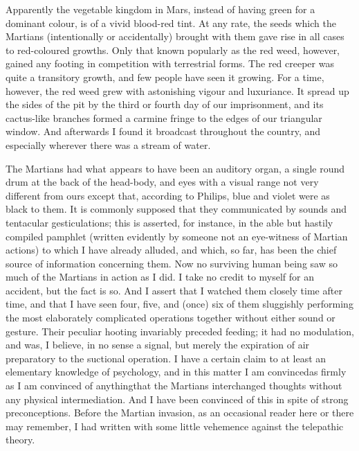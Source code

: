 Apparently the vegetable kingdom in Mars, instead of having green
for a dominant colour, is of a vivid blood-red tint. At any rate,
the seeds which the Martians (intentionally or accidentally)
brought with them gave rise in all cases to red-coloured growths.
Only that known popularly as the red weed, however, gained any
footing in competition with terrestrial forms. The red creeper was
quite a transitory growth, and few people have seen it growing. For
a time, however, the red weed grew with astonishing vigour and
luxuriance. It spread up the sides of the pit by the third or
fourth day of our imprisonment, and its cactus-like branches formed
a carmine fringe to the edges of our triangular window. And
afterwards I found it broadcast throughout the country, and
especially wherever there was a stream of water.

The Martians had what appears to have been an auditory organ, a
single round drum at the back of the head-body, and eyes with a
visual range not very different from ours except that, according to
Philips, blue and violet were as black to them. It is commonly
supposed that they communicated by sounds and tentacular
gesticulations; this is asserted, for instance, in the able but
hastily compiled pamphlet (written evidently by someone not an
eye-witness of Martian actions) to which I have already alluded,
and which, so far, has been the chief source of information
concerning them. Now no surviving human being saw so much of the
Martians in action as I did. I take no credit to myself for an
accident, but the fact is so. And I assert that I watched them
closely time after time, and that I have seen four, five, and
(once) six of them sluggishly performing the most elaborately
complicated operations together without either sound or gesture.
Their peculiar hooting invariably preceded feeding; it had no
modulation, and was, I believe, in no sense a signal, but merely
the expiration of air preparatory to the suctional operation. I
have a certain claim to at least an elementary knowledge of
psychology, and in this matter I am convinced\dash{}as firmly as I am
convinced of anything\dash{}that the Martians interchanged thoughts
without any physical intermediation. And I have been convinced of
this in spite of strong preconceptions. Before the Martian
invasion, as an occasional reader here or there may remember, I had
written with some little vehemence against the telepathic theory.

